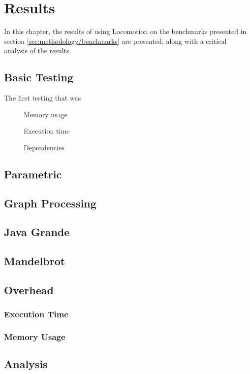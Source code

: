 \chapter{Results} \label{chp:results}
In this chapter, the results of using Locomotion on the benchmarks presented in section \ref{sec:methodology/benchmarks} are presented, along with a critical analysis of the results.

\section{Basic Testing} \label{sec:results/basic}
The first testing that was

\begin{figure}[H]
	\centering
	\caption{Memory usage}
\end{figure}

\begin{figure}[H]
	\centering
	\caption{Execution time}
\end{figure}

\begin{figure}[H]
	\centering
	\caption{Dependencies}
\end{figure}

\section{Parametric} \label{sec:results/parametric}

\section{Graph Processing} \label{sec:results/graph}

\section{Java Grande} \label{sec:results/grande}

\section{Mandelbrot} \label{sec:results/mandelbrot}

\section{Overhead} \label{sec:results/overhead}
	\subsection{Execution Time} \label{sec:results/overhead/time}
	
	\subsection{Memory Usage} \label{sec:results/overhead/memory}

\section{Analysis} \label{sec:results/analysis}